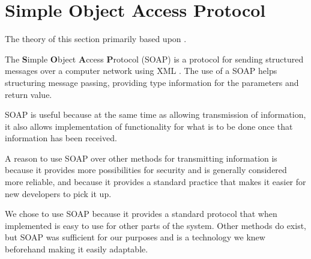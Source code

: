 \section{Simple Object Access Protocol}
The theory of this section primarily based upon \citep{misc:understandingsoapandrest, misc:restsoapwhen}.

The \textbf{S}imple \textbf{O}bject \textbf{A}ccess \textbf{P}rotocol (SOAP) is a protocol for sending structured messages over a computer network using XML \citep{misc:soapintro}.
The use of a SOAP helps structuring message passing, providing type information for the parameters and return value. 

SOAP is useful because at the same time as allowing transmission of information, it also allows implementation of functionality for what is to be done once that information has been received.

A reason to use SOAP over other methods for transmitting information is because it provides more possibilities for security and is generally considered more reliable, and because it provides a standard practice that makes it easier for new developers to pick it up. 

We chose to use SOAP because it provides a standard protocol that when implemented is easy to use for other parts of the system.
Other methods do exist, but SOAP was sufficient for our purposes and is a technology we knew beforehand making it easily adaptable.